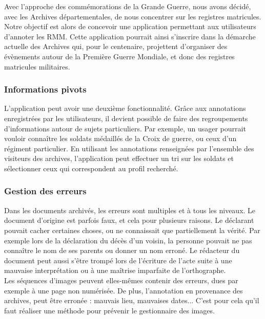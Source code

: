 \documentclass[a4paper]{article}
\begin{document}
Avec l'approche des comm\'emorations de la Grande Guerre, nous avons d\'ecid\'e, avec les Archives d\'epartementales, de nous concentrer sur les registres matricules. Notre objectif est alors de concevoir une application permettant aux utilisateurs d'annoter les RMM. Cette application pourrait ainsi s'inscrire dans la d\'emarche actuelle des Archives qui, pour le centenaire, projettent d'organiser des \'ev\`enements autour de la Premi\`ere Guerre Mondiale, et donc des registres matricules militaires.

\subsubsection{Informations pivots}

L'application peut avoir une deuxi\`eme fonctionnalit\'e. Gr\^ace aux annotations enregistr\'ees par les utilisateurs, il devient possible de faire des regroupements d'informations autour de sujets particuliers. Par exemple, un usager pourrait vouloir conna\^itre les soldats m\'edaill\'es de la Croix de guerre, ou ceux d'un r\'egiment particulier. En utilisant les annotations renseign\'ees par l'ensemble des visiteurs des archives, l'application peut effectuer un tri sur les soldats et s\'electionner ceux qui correspondent au profil recherch\'e.

\subsubsection{Gestion des erreurs}

Dans les documents archiv\'es, les erreurs sont multiples et \`a tous les niveaux. Le document d'origine est parfois faux, et cela pour plusieurs raisons. Le d\'eclarant pouvait cacher certaines choses, ou ne connaissait que partiellement la v\'erit\'e. Par exemple lors de la d\'eclaration du d\'ec\`es d'un voisin, la personne pouvait ne pas conna\^itre le nom de ses parents ou donner un nom erron\'e. Le r\'edacteur du document peut aussi s'\^etre tromp\'e lors de l'\'ecriture de l'acte suite \`a une mauvaise interpr\'etation ou \`a une ma\^itrise imparfaite de l'orthographe. 
\\

Les s\'equences d'images peuvent elles-m\^emes contenir des erreurs, dues par exemple \`a une page non num\'eris\'ee. De plus, l'annotation en provenance des archives, peut \^etre erron\'ee : mauvais lieu, mauvaises dates... C'est pour cela qu'il faut r\'ealiser une m\'ethode pour pr\'evenir le gestionnaire des images.
\\
\end{document}
